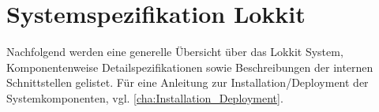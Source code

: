 \chapter{Systemspezifikation Lokkit}
\label{cha:Systemspezifikation}
Nachfolgend werden eine generelle Übersicht über das Lokkit System, Komponentenweise Detailspezifikationen sowie Beschreibungen der internen Schnittstellen gelistet. Für eine Anleitung zur Installation/Deployment der Systemkomponenten, vgl. \ref{cha:Installation_Deployment}.





